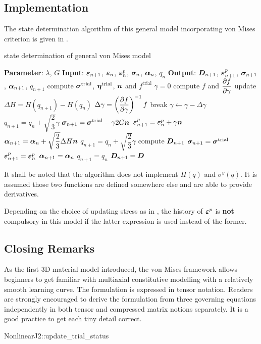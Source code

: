 \subsection{Implementation}
The state determination algorithm of this general model incorporating von Mises criterion is given in .
\begin{breakablealgorithm}
\caption{state determination of general von Mises model}\label{algo:j2_model}
\begin{algorithmic}
\State \textbf{Parameter}: $\lambda$, $G$
\State \textbf{Input}: $\bm{\varepsilon}_{n+1}$, $\bm{\varepsilon}_n$, $\bm{\varepsilon}^p_n$, $\bm{\sigma}_n$, $\bm{\alpha}_n$, $q_n$
\State \textbf{Output}: $\bm{D}_{n+1}$, $\bm{\varepsilon}^p_{n+1}$, $\bm{\sigma}_{n+1}$, $\bm{\alpha}_{n+1}$, $q_{n+1}$
\State compute $\bm{\sigma}^\text{trial}$, $\bm{\eta}^\text{trial}$, $\bm{n}$ and $f^\text{trial}$
\State $\gamma=0$
\State compute $f$ and $\dfrac{\partial{f}}{\partial{\gamma}}$
\State update $\Delta{}H=H\left(q_{n+1}\right)-H\left(q_n\right)$
\State $\Delta\gamma=\left(\dfrac{\partial{f}}{\partial{\gamma}}\right)^{-1}f$
\State break
\EndIf
\State $\gamma\leftarrow\gamma-\Delta\gamma$
\State $q_{n+1}=q_n+\sqrt{\dfrac{2}{3}}\gamma$
\EndWhile
\State $\bm{\sigma}_{n+1}=\bm{\sigma}^\text{trial}-\gamma2G\bm{n}$
\State $\bm{\varepsilon}^p_{n+1}=\bm{\varepsilon}^p_n+\gamma\bm{n}$
\State $\bm{\alpha}_{n+1}=\bm{\alpha}_n+\sqrt{\dfrac{2}{3}}\Delta{}H\bm{n}$
\State $q_{n+1}=q_n+\sqrt{\dfrac{2}{3}}\gamma$
\State compute $\bm{D}_{n+1}$
\Else
\State $\bm{\sigma}_{n+1}=\bm{\sigma}^\text{trial}$
\State $\bm{\varepsilon}^p_{n+1}=\bm{\varepsilon}^p_n$
\State $\bm{\alpha}_{n+1}=\bm{\alpha}_n$
\State $q_{n+1}=q_n$
\State $\bm{D}_{n+1}=\bm{D}$
\EndIf
\end{algorithmic}
\end{breakablealgorithm}
It shall be noted that the algorithm does not implement $H\left(q\right)$ and $\sigma^y\left(q\right)$. It is assumed those two functions are defined somewhere else and are able to provide derivatives.

Depending on the choice of updating stress as in , the history of $\bm{\varepsilon}^p$ is \textbf{not} compulsory in this model if the latter expression is used instead of the former.
\subsection{Closing Remarks}
As the first 3D material model introduced, the von Mises framework allows beginners to get familiar with multiaxial constitutive modelling with a relatively smooth learning curve. The formulation is expressed in tensor notation. Readers are strongly encouraged to derive the formulation from three governing equations independently in both tensor and compressed matrix notions separately. It is a good practice to get each tiny detail correct.
\begin{cppcode}
NonlinearJ2::update_trial_status
\end{cppcode}

